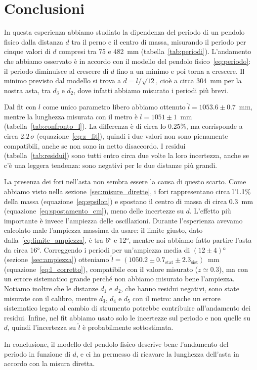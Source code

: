 \documentclass[a4paper]{article}
\begin{document}
\section{Conclusioni}\label{sec:conclusioni}

In questa esperienza abbiamo studiato la dipendenza del periodo di un pendolo fisico dalla distanza $d$ tra il perno e il centro di massa, misurando il periodo per cinque valori di $d$ compresi tra 75 e 482~mm (tabella~\ref{tab:periodi}). L'andamento che abbiamo osservato è in accordo con il modello del pendolo fisico~\eqref{eq:periodo}: il periodo diminuisce al crescere di $d$ fino a un minimo e poi torna a crescere. Il minimo previsto dal modello si trova a $d = l/\sqrt{12}$, cioè a circa 304~mm per la nostra asta, tra $d_3$ e $d_2$, dove infatti abbiamo misurato i periodi più brevi.

Dal fit con $l$ come unico parametro libero abbiamo ottenuto $\hat{l} = 1053.6 \pm 0.7$~mm, mentre la lunghezza misurata con il metro \`e $l = 1051 \pm 1$~mm (tabella~\ref{tab:confronto_l}). La differenza è di circa lo 0.25\%, ma corrisponde a circa $2.2\,\sigma$ (equazione~\eqref{eq:z_fit}), quindi i due valori non sono pienamente compatibili, anche se non sono in netto disaccordo. I residui (tabella~\ref{tab:residui}) sono tutti entro circa due volte la loro incertezza, anche se c'è una leggera tendenza: sono negativi per le due distanze più grandi.

La presenza dei fori nell'asta non sembra essere la causa di questo scarto. Come abbiamo visto nella sezione~\ref{sec:misure_dirette}, i fori rappresentano circa l'1.1\% della massa (equazione~\eqref{eq:epsilon}) e spostano il centro di massa di circa 0.3~mm (equazione~\eqref{eq:spostamento_cm}), meno delle incertezze su $d$. L'effetto più importante è invece l'ampiezza delle oscillazioni. Durante l'esperienza avevamo calcolato male l'ampiezza massima da usare: il limite giusto, dato dalla~\eqref{eq:limite_ampiezza}, è tra 6° e 12°, mentre noi abbiamo fatto partire l'asta da circa 16°. Correggendo i periodi per un'ampiezza media di $(12 \pm 4)$° (sezione~\ref{sec:ampiezza}) otteniamo $\hat{l} = (1050.2 \pm 0.7_{\mathrm{stat}} \pm 2.3_{\mathrm{sist}})$~mm (equazione~\eqref{eq:l_corretto}), compatibile con il valore misurato ($z \simeq 0.3$), ma con un errore sistematico grande perché non abbiamo misurato bene l'ampiezza. Notiamo inoltre che le distanze $d_1$ e $d_2$, che hanno residui negativi, sono state misurate con il calibro, mentre $d_3$, $d_4$ e $d_5$ con il metro: anche un errore sistematico legato al cambio di strumento potrebbe contribuire all'andamento dei residui. Infine, nel fit abbiamo usato solo le incertezze sul periodo e non quelle su $d$, quindi l'incertezza su $\hat{l}$ è probabilmente sottostimata.

In conclusione, il modello del pendolo fisico descrive bene l'andamento del periodo in funzione di $d$, e ci ha permesso di ricavare la lunghezza dell'asta in accordo con la misura diretta.
\end{document}
